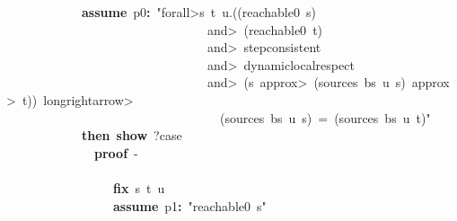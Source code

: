 \documentclass{article}
\newcommand{\syntaxKEYWORDA}[1]{\textcolor[rgb]{0.0,0.4,0.6}{\textbf{#1}}}
\newcommand{\syntaxKEYWORDC}[1]{\textcolor[rgb]{0.0,0.6,1.0}{\textbf{#1}}}
\newcommand{\syntaxLITERALA}[1]{\textcolor[rgb]{1.0,0.0,0.8}{#1}}
\newcommand{\syntaxOPERATOR}[1]{\textcolor[rgb]{0.0,0.0,0.0}{\textbf{#1}}}
\newcommand{\syntaxKEYWORDA}[1]{\textcolor[rgb]{0.0,0.4,0.6}{\textbf{#1}}}
\newcommand{\syntaxKEYWORDC}[1]{\textcolor[rgb]{0.0,0.6,1.0}{\textbf{#1}}}
\newcommand{\syntaxLITERALA}[1]{\textcolor[rgb]{1.0,0.0,0.8}{#1}}
\newcommand{\syntaxOPERATOR}[1]{\textcolor[rgb]{0.0,0.0,0.0}{\textbf{#1}}}
\newcommand{\syntaxKEYWORDA}[1]{\textcolor[rgb]{0.0,0.4,0.6}{\textbf{#1}}}
\newcommand{\syntaxKEYWORDC}[1]{\textcolor[rgb]{0.0,0.6,1.0}{\textbf{#1}}}
\newcommand{\syntaxLITERALA}[1]{\textcolor[rgb]{1.0,0.0,0.8}{#1}}
\newcommand{\syntaxOPERATOR}[1]{\textcolor[rgb]{0.0,0.0,0.0}{\textbf{#1}}}
\newcommand{\syntaxKEYWORDA}[1]{\textcolor[rgb]{0.0,0.4,0.6}{#1}}
\newcommand{\syntaxKEYWORDC}[1]{\textcolor[rgb]{0.0,0.6,1.0}{#1}}
\newcommand{\syntaxLITERALA}[1]{\textcolor[rgb]{1.0,0.0,0.8}{\textbf{#1}}}
\newcommand{\syntaxOPERATOR}[1]{\textcolor[rgb]{0.0,0.0,0.0}{#1}}
\newcommand{\syntaxKEYWORDA}[1]{\textcolor[rgb]{0.0,0.4,0.6}{\textbf{#1}}}
\newcommand{\syntaxKEYWORDC}[1]{\textcolor[rgb]{0.0,0.6,1.0}{\textbf{#1}}}
\newcommand{\syntaxLITERALA}[1]{\textcolor[rgb]{1.0,0.0,0.8}{#1}}
\newcommand{\syntaxOPERATOR}[1]{\textcolor[rgb]{0.0,0.0,0.0}{\textbf{#1}}}
\newcommand{\syntaxKEYWORDA}[1]{\textcolor[rgb]{0.0,0.4,0.6}{\textbf{#1}}}
\newcommand{\syntaxKEYWORDC}[1]{\textcolor[rgb]{0.0,0.6,1.0}{\textbf{#1}}}
\newcommand{\syntaxLITERALA}[1]{\textcolor[rgb]{1.0,0.0,0.8}{#1}}
\newcommand{\syntaxOPERATOR}[1]{\textcolor[rgb]{0.0,0.0,0.0}{\textbf{#1}}}
\begin{document}
{\ }{\ }{\ }{\ }{\ }{\ }{\ }{\ }{\ }{\ }{\ }{\ }\syntaxKEYWORDC{assume}{\ }p0\syntaxOPERATOR{:}{\ }\syntaxLITERALA{"\<forall>s{\ }t{\ }u.((reachable0{\ }s){\ }}\hspace*{\fill}\\
\syntaxLITERALA{{\ }{\ }{\ }{\ }{\ }{\ }{\ }{\ }{\ }{\ }{\ }{\ }{\ }{\ }{\ }{\ }{\ }{\ }{\ }{\ }{\ }{\ }{\ }{\ }{\ }{\ }{\ }{\ }{\ }{\ }{\ }{\ }\<and>{\ }(reachable0{\ }t){\ }}\hspace*{\fill}\\
\syntaxLITERALA{{\ }{\ }{\ }{\ }{\ }{\ }{\ }{\ }{\ }{\ }{\ }{\ }{\ }{\ }{\ }{\ }{\ }{\ }{\ }{\ }{\ }{\ }{\ }{\ }{\ }{\ }{\ }{\ }{\ }{\ }{\ }{\ }\<and>{\ }step\usebox{\underscorebox}consistent{\ }}\hspace*{\fill}\\
\syntaxLITERALA{{\ }{\ }{\ }{\ }{\ }{\ }{\ }{\ }{\ }{\ }{\ }{\ }{\ }{\ }{\ }{\ }{\ }{\ }{\ }{\ }{\ }{\ }{\ }{\ }{\ }{\ }{\ }{\ }{\ }{\ }{\ }{\ }\<and>{\ }dynamic\usebox{\underscorebox}local\usebox{\underscorebox}respect{\ }}\hspace*{\fill}\\
\syntaxLITERALA{{\ }{\ }{\ }{\ }{\ }{\ }{\ }{\ }{\ }{\ }{\ }{\ }{\ }{\ }{\ }{\ }{\ }{\ }{\ }{\ }{\ }{\ }{\ }{\ }{\ }{\ }{\ }{\ }{\ }{\ }{\ }{\ }\<and>{\ }(s{\ }\<approx>{\ }(sources{\ }bs{\ }u{\ }s){\ }\<approx>{\ }t)){\ }\<longrightarrow>}\hspace*{\fill}\\
\syntaxLITERALA{{\ }{\ }{\ }{\ }{\ }{\ }{\ }{\ }{\ }{\ }{\ }{\ }{\ }{\ }{\ }{\ }{\ }{\ }{\ }{\ }{\ }{\ }{\ }{\ }{\ }{\ }{\ }{\ }{\ }{\ }{\ }{\ }{\ }{\ }(sources{\ }bs{\ }u{\ }s){\ }={\ }(sources{\ }bs{\ }u{\ }t)"}\hspace*{\fill}\\
{\ }{\ }{\ }{\ }{\ }{\ }{\ }{\ }{\ }{\ }{\ }{\ }\syntaxKEYWORDA{then}{\ }\syntaxKEYWORDC{show}{\ }?case\hspace*{\fill}\\
{\ }{\ }{\ }{\ }{\ }{\ }{\ }{\ }{\ }{\ }{\ }{\ }{\ }{\ }\syntaxKEYWORDA{proof}{\ }{-}\hspace*{\fill}\\
{\ }{\ }{\ }{\ }{\ }{\ }{\ }{\ }{\ }{\ }{\ }{\ }{\ }{\ }\syntaxKEYWORDA{\usebox{\opencurlybracket}}\hspace*{\fill}\\
{\ }{\ }{\ }{\ }{\ }{\ }{\ }{\ }{\ }{\ }{\ }{\ }{\ }{\ }{\ }{\ }{\ }\syntaxKEYWORDC{fix}{\ }s{\ }t{\ }u\hspace*{\fill}\\
{\ }{\ }{\ }{\ }{\ }{\ }{\ }{\ }{\ }{\ }{\ }{\ }{\ }{\ }{\ }{\ }{\ }\syntaxKEYWORDC{assume}{\ }p1\syntaxOPERATOR{:}{\ }\syntaxLITERALA{"reachable0{\ }s"}\hspace*{\fill}\\
\end{document}
